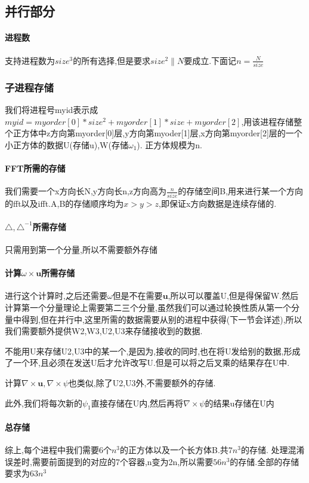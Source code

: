\documentclass[UTF8]{ctexart}
\begin{document}
\subsection{并行部分}

\paragraph{进程数}
支持进程数为$size^3$的所有选择,但是要求$size^2\|N$要成立.下面记$n=\frac{N}{size}$
\subsubsection{子进程存储}
我们将进程号myid表示成$myid=myorder[0]*size^2+myorder[1]*size+myorder[2]$,用该进程存储整个正方体中z方向第myorder[0]层,y方向第myoder[1]层,x方向第myorder[2]层的一个小正方体的数据U(存储u),W(存储$\omega_1$). 正方体规模为n.
\paragraph{FFT所需的存储}
我们需要一个x方向长N,y方向长n,z方向高为$\frac{n}{size}$的存储空间B,用来进行某一个方向的fft以及ifft.A,B的存储顺序均为$x>y>z$,即保证x方向数据是连续存储的.
\paragraph{$\triangle,\triangle^{-1}$所需存储}
只需用到第一个分量,所以不需要额外存储
\paragraph{计算$\omega\times\mathbf{u}$所需存储}
进行这个计算时,之后还需要$\omega$但是不在需要$\mathbf{u}$,所以可以覆盖U,但是得保留W.然后计算第一个分量理论上需要第二三个分量,虽然我们可以通过轮换性质从第一个分量中得到,但在并行中,这里所需的数据需要从别的进程中获得(下一节会详述),所以我们需要额外提供W2,W3,U2,U3来存储接收到的数据.

不能用U来存储U2,U3中的某一个,是因为,接收的同时,也在将U发给别的数据,形成了一个环,且必须在发送U后才允许改写U.但是可以将之后叉乘的结果存在U中.

计算$\nabla \times \mathbf{u},\nabla \times \psi$也类似,除了U2,U3外,不需要额外的存储.

此外,我们将每次新的$\psi_1$直接存储在U内,然后再将$\nabla \times \psi$的结果u存储在U内

\paragraph{总存储}
综上,每个进程中我们需要6个$n^3$的正方体以及一个长方体B.共$7n^3$的存储. 处理混淆误差时,需要前面提到的对应的7个容器,n变为2n,所以需要$56n^3$的存储.全部的存储要求为$63n^3$
\end{document}
